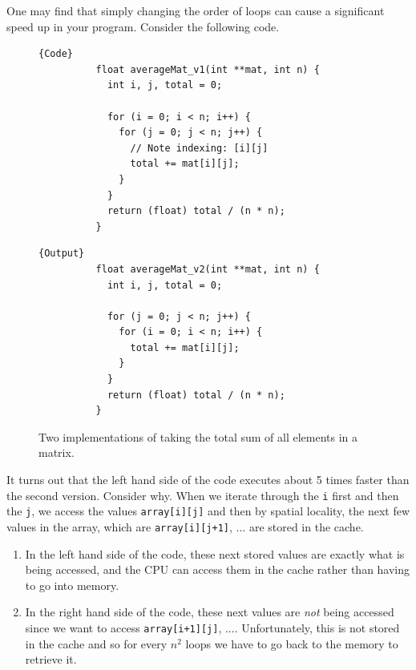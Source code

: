 \documentclass{article}
\begin{document}
    \begin{example}
      One may find that simply changing the order of loops can cause a significant speed up in your program. Consider the following code. 
      \begin{figure}[H]
        \centering 
        \noindent\begin{minipage}{.5\textwidth}
        \begin{lstlisting}[]{Code}
          float averageMat_v1(int **mat, int n) {
            int i, j, total = 0;

            for (i = 0; i < n; i++) {
              for (j = 0; j < n; j++) {
                // Note indexing: [i][j]
                total += mat[i][j];
              }
            }
            return (float) total / (n * n);
          }
        \end{lstlisting}
        \end{minipage}
        \hfill
        \begin{minipage}{.49\textwidth}
        \begin{lstlisting}[]{Output}
          float averageMat_v2(int **mat, int n) {
            int i, j, total = 0;

            for (j = 0; j < n; j++) {
              for (i = 0; i < n; i++) {
                total += mat[i][j];
              }
            }
            return (float) total / (n * n);
          }
        \end{lstlisting}
        \end{minipage}
        \caption{Two implementations of taking the total sum of all elements in a matrix.} 
        \label{fig:matrix_sum}
      \end{figure}
      It turns out that the left hand side of the code executes about 5 times faster than the second version. Consider why. When we iterate through the \texttt{i} first and then the \texttt{j}, we access the values \texttt{array[i][j]} and then by spatial locality, the next few values in the array, which are \texttt{array[i][j+1]}, ... are stored in the cache. 
      \begin{enumerate}
        \item In the left hand side of the code, these next stored values are exactly what is being accessed, and the CPU can access them in the cache rather than having to go into memory. 
        \item In the right hand side of the code, these next values are \textit{not} being accessed since we want to access \texttt{array[i+1][j]}, .... Unfortunately, this is not stored in the cache and so for every $n^2$ loops we have to go back to the memory to retrieve it. 
      \end{enumerate}
    \end{example}
\end{document}
